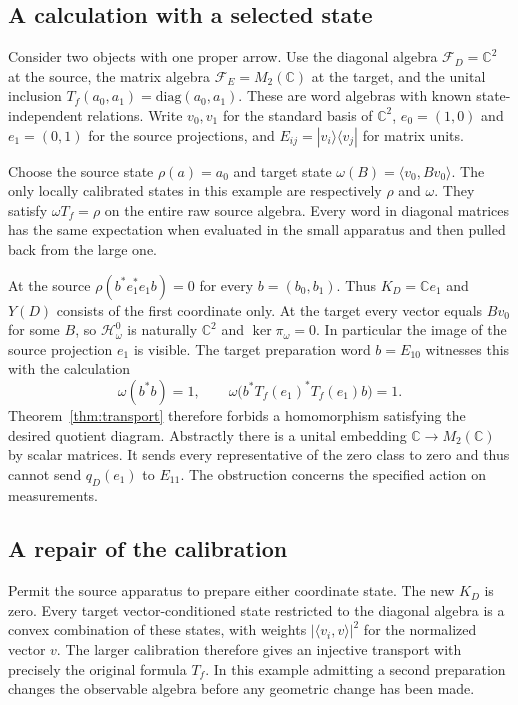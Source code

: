 \documentclass[11pt,letterpaper]{article}
\newcommand{\F}{\mathcal F}
\begin{document}
\subsection{A calculation with a selected state}

Consider two objects with one proper arrow. Use the diagonal algebra $\F_D=\mathbb C^2$ at the source, the matrix algebra $\F_E=M_2(\mathbb C)$ at the target, and the unital inclusion $T_f(a_0,a_1)=\mathrm{diag}(a_0,a_1)$. These are word algebras with known state-independent relations. Write $v_0,v_1$ for the standard basis of $\mathbb C^2$, $e_0=(1,0)$ and $e_1=(0,1)$ for the source projections, and $E_{ij}=|v_i\rangle\langle v_j|$ for matrix units.

Choose the source state $\rho(a)=a_0$ and target state $\omega(B)=\langle v_0,Bv_0\rangle$. The only locally calibrated states in this example are respectively $\rho$ and $\omega$. They satisfy $\omega T_f=\rho$ on the entire raw source algebra. Every word in diagonal matrices has the same expectation when evaluated in the small apparatus and then pulled back from the large one.

At the source $\rho(b^*e_1^*e_1 b)=0$ for every $b=(b_0,b_1)$. Thus $K_D=\mathbb C e_1$ and $Y(D)$ consists of the first coordinate only. At the target every vector equals $Bv_0$ for some $B$, so $\mathcal H_\omega^0$ is naturally $\mathbb C^2$ and $\ker\pi_\omega=0$. In particular the image of the source projection $e_1$ is visible. The target preparation word $b=E_{10}$ witnesses this with the calculation
\begin{equation}
 \omega(b^*b)=1,\qquad
 \omega\big(b^*T_f(e_1)^*T_f(e_1)b\big)=1.       \label{eq:witness}
\end{equation}
Theorem~\ref{thm:transport} therefore forbids a homomorphism satisfying the desired quotient diagram. Abstractly there is a unital embedding $\mathbb C\to M_2(\mathbb C)$ by scalar matrices. It sends every representative of the zero class to zero and thus cannot send $q_D(e_1)$ to $E_{11}$. The obstruction concerns the specified action on measurements.

\subsection{A repair of the calibration}

Permit the source apparatus to prepare either coordinate state. The new $K_D$ is zero. Every target vector-conditioned state restricted to the diagonal algebra is a convex combination of these states, with weights $|\langle v_i,v\rangle|^2$ for the normalized vector $v$. The larger calibration therefore gives an injective transport with precisely the original formula $T_f$. In this example admitting a second preparation changes the observable algebra before any geometric change has been made.
\end{document}
